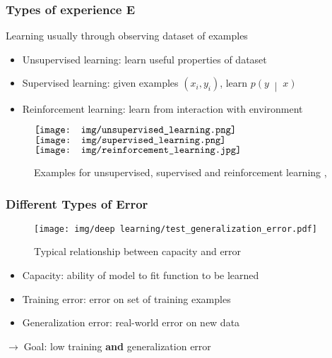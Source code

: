\documentclass{beamer}
\newcommand{\arrow}{$\rightarrow\;$}
\renewcommand{\c}[2]{\left(#1\;\middle|\;#2\right)}
\begin{document}
\begin{frame}
    \frametitle{Types of experience E}
    Learning usually through observing dataset of examples 
    \begin{itemize}
        \item Unsupervised learning: learn useful properties of dataset
        \item Supervised learning: given examples $(x_i, y_i)$, learn $p\c{y}{x}$
        \item Reinforcement learning: learn from interaction with environment
    \end{itemize}
    
    \begin{figure}
        \hspace{-2em}
        $\vcenter{\hbox{\texttt{[image: img/unsupervised\_learning.png]}}}$
        $\vcenter{\hbox{\texttt{[image: img/supervised\_learning.png]}}}$
        $\vcenter{\hbox{\texttt{[image: img/reinforcement\_learning.jpg]}}}$
        \hspace{-2em}
        \caption{Examples for unsupervised, supervised and reinforcement learning \cite{unsupervised}, \cite{supervised} \cite{reinforcement}}
    \end{figure}
\end{frame}

\begin{frame}
    \frametitle{Different Types of Error}
    \begin{figure}[H]
        \texttt{[image: img/deep learning/test\_generalization\_error.pdf]}
        \caption{Typical relationship between capacity and error \cite{textbook}}
    \end{figure}
    
    \begin{itemize}
        \item Capacity: ability of model to fit function to be learned
        \item Training error: error on set of training examples
        \item Generalization error: real-world error on new data
    \end{itemize}
    \arrow Goal: low training \textbf{and} generalization error
\end{frame}
\end{document}

